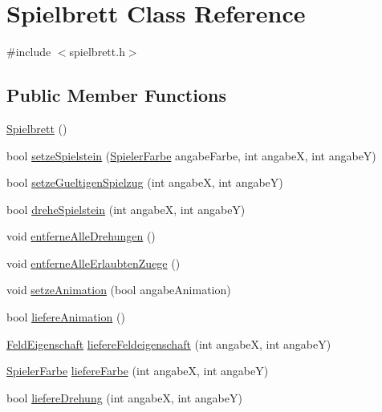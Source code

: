 \hypertarget{classSpielbrett}{\section{Spielbrett Class Reference}
\label{classSpielbrett}
}


{\ttfamily \#include $<$spielbrett.\-h$>$}

\subsection*{Public Member Functions}
\begin{DoxyCompactItemize}
\item 
\hyperlink{classSpielbrett_ad1030668197b68a9db4626ae52fb5392}{Spielbrett} ()
\item 
bool \hyperlink{classSpielbrett_a1a4f79a33ee43258499cae2040093f46}{setze\-Spielstein} (\hyperlink{DEFINE_8h_af7777a498318335ea89b85bdc0d1651f}{Spieler\-Farbe} angabe\-Farbe, int angabe\-X, int angabe\-Y)
\item 
bool \hyperlink{classSpielbrett_ac8d008e1bd3471f99a5d25ceb1bf5caa}{setze\-Gueltigen\-Spielzug} (int angabe\-X, int angabe\-Y)
\item 
bool \hyperlink{classSpielbrett_a4ea6649406b8bc45ab9772b9f0a9f0a8}{drehe\-Spielstein} (int angabe\-X, int angabe\-Y)
\item 
void \hyperlink{classSpielbrett_aad45932000bdb82cc1c58c4dbce08045}{entferne\-Alle\-Drehungen} ()
\item 
void \hyperlink{classSpielbrett_a33d8b89cbb4266c522b950d58f180ad0}{entferne\-Alle\-Erlaubten\-Zuege} ()
\item 
void \hyperlink{classSpielbrett_ae561de28444766bf74705f7fc1d396f2}{setze\-Animation} (bool angabe\-Animation)
\item 
bool \hyperlink{classSpielbrett_a973e4e3f43906428d50479001c08aae5}{liefere\-Animation} ()
\item 
\hyperlink{DEFINE_8h_a38d3a135c8443ff29d22fa0756476c5b}{Feld\-Eigenschaft} \hyperlink{classSpielbrett_aa16a4e86f849602fd6868cc6772c46c2}{liefere\-Feldeigenschaft} (int angabe\-X, int angabe\-Y)
\item 
\hyperlink{DEFINE_8h_af7777a498318335ea89b85bdc0d1651f}{Spieler\-Farbe} \hyperlink{classSpielbrett_a361157137c7c7cda4e06f568131c8fc9}{liefere\-Farbe} (int angabe\-X, int angabe\-Y)
\item 
bool \hyperlink{classSpielbrett_a9ff04ceff05cfd689057788f8df4774f}{liefere\-Drehung} (int angabe\-X, int angabe\-Y)
\end{DoxyCompactItemize}


